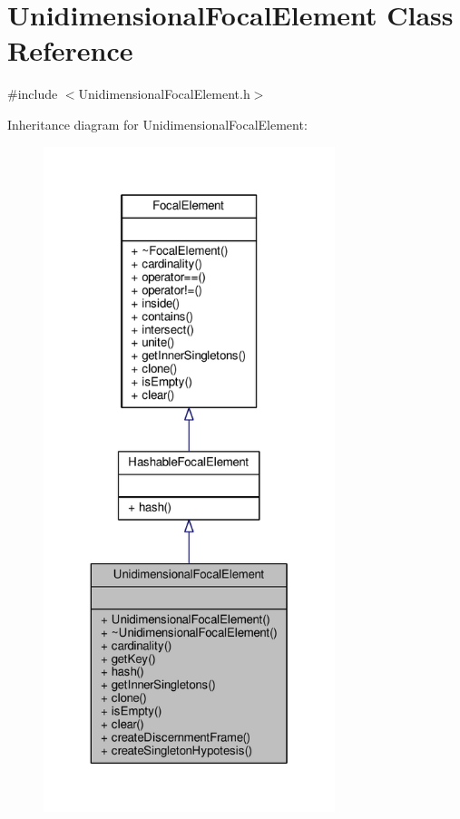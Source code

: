 \hypertarget{classUnidimensionalFocalElement}{}\section{Unidimensional\+Focal\+Element Class Reference}
\label{classUnidimensionalFocalElement}


{\ttfamily \#include $<$Unidimensional\+Focal\+Element.\+h$>$}



Inheritance diagram for Unidimensional\+Focal\+Element\+:\nopagebreak
\begin{figure}[H]
\begin{center}
\leavevmode
\includegraphics[height=550pt]{classUnidimensionalFocalElement__inherit__graph}
\end{center}
\end{figure}


